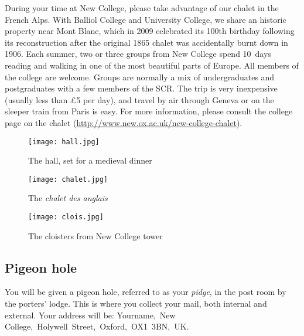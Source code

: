 During your time at New College, please take advantage of our chalet in the
French Alps. With Balliol College and University College, we share an historic
property near Mont Blanc, which in 2009 celebrated its 100th birthday following
its reconstruction after the original 1865 chalet was accidentally burnt down in
1906. Each summer, two or three groups from New College spend 10~days reading
and walking in one of the most beautiful parts of Europe. All members of the college are welcome.
Groups are normally a mix of undergraduates and postgraduates with a few members
of the SCR. The trip is very inexpensive (usually less than \pounds5 per day), and
travel by air through Geneva or on the sleeper train from Paris is easy. For
more information, please consult the college page on the chalet
(\url{http://www.new.ox.ac.uk/new-college-chalet}).

\begin{figure}[htbp]
\centering
		\begin{minipage}{0.3\textwidth}
                \texttt{[image: hall.jpg]}
                \caption[Hall: Photo credit to Maureen Lenker]{The hall, set for
                a medieval dinner}
                \label{fig:hall}
        \end{minipage}%
        \quad
        \begin{minipage}{0.33\textwidth}
                \texttt{[image: chalet.jpg]}
                \caption[Chalet: Photo credit to Nick Altemose]{The
                \emph{cha\-let des ang\-lais}}
                \label{fig:chalet}
        \end{minipage}%
        \quad
        \begin{minipage}{0.3\textwidth}
                \texttt{[image: clois.jpg]}
                \caption[Cloisters: Photo credit to Alex Graham]{The cloisters
                from New College tower}
                \label{fig:clois}
        \end{minipage}%
\end{figure}

\subsection{Pigeon hole}

You will be given a pigeon hole, referred to as your \emph{pidge}, in the post
room by the porters' lodge. This is where you collect your mail, both internal and external. Your address will be: Yourname,~New College,~Holywell~Street,~Oxford,~OX1~3BN,~UK.

